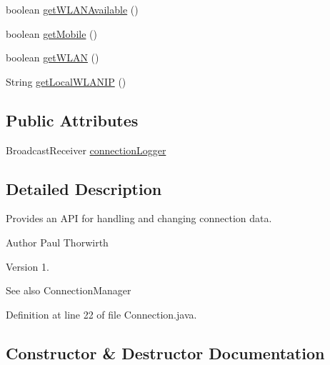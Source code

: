 \begin{DoxyCompactItemize}
\item 
boolean \hyperlink{classswp_1_1tuilmenau_1_1carduinodroid_1_1controller_1_1_connection_a960f3033213736a2ca426a478ad85a3c}{get\+W\+L\+A\+N\+Available} ()
\item 
boolean \hyperlink{classswp_1_1tuilmenau_1_1carduinodroid_1_1controller_1_1_connection_a3ea65267df8d63ec6a67e511067a674c}{get\+Mobile} ()
\item 
boolean \hyperlink{classswp_1_1tuilmenau_1_1carduinodroid_1_1controller_1_1_connection_acc74178e090418a8ae95b2f2840cf06e}{get\+W\+L\+A\+N} ()
\item 
String \hyperlink{classswp_1_1tuilmenau_1_1carduinodroid_1_1controller_1_1_connection_a478434825ab767b5bf14834a1062abb3}{get\+Local\+W\+L\+A\+N\+I\+P} ()
\end{DoxyCompactItemize}
\subsection*{Public Attributes}
\begin{DoxyCompactItemize}
\item 
Broadcast\+Receiver \hyperlink{classswp_1_1tuilmenau_1_1carduinodroid_1_1controller_1_1_connection_a51750bd8eb6df23e9b7523d81b57324b}{connection\+Logger}
\end{DoxyCompactItemize}


\subsection{Detailed Description}
Provides an A\+P\+I for handling and changing connection data.

\begin{DoxyAuthor}{Author}
Paul Thorwirth 
\end{DoxyAuthor}
\begin{DoxyVersion}{Version}
1. 
\end{DoxyVersion}
\begin{DoxySeeAlso}{See also}
Connection\+Manager 
\end{DoxySeeAlso}


Definition at line 22 of file Connection.\+java.



\subsection{Constructor \& Destructor Documentation}
\hypertarget{classswp_1_1tuilmenau_1_1carduinodroid_1_1controller_1_1_connection_a34bd7c0e4a3a6178864064c97c076adf}{}
